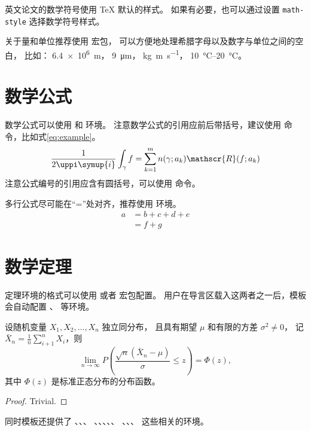 英文论文的数学符号使用 \TeX{} 默认的样式。
如果有必要，也可以通过设置 \verb|math-style| 选择数学符号样式。

关于量和单位推荐使用
\href{http://mirrors.ctan.org/macros/latex/contrib/siunitx/siunitx.pdf}{}
宏包，
可以方便地处理希腊字母以及数字与单位之间的空白，
比如：
\SI{6.4e6}{m}，
\SI{9}{\micro\meter}，
\si{kg.m.s^{-1}}，
\SIrange{10}{20}{\degreeCelsius}。



\section{数学公式}

数学公式可以使用  和  环境。
注意数学公式的引用应前后带括号，建议使用  命令，比如式\eqref{eq:example}。
\begin{equation}
  \frac{1}{2 \uppi \symup{i}} \int_\gamma f = \sum_{k=1}^m n(\gamma; a_k) \mathscr{R}(f; a_k)
  \label{eq:example}
\end{equation}
注意公式编号的引用应含有圆括号，可以使用  命令。

多行公式尽可能在“=”处对齐，推荐使用  环境。
\begin{align}
  a & = b + c + d + e \\
    & = f + g
\end{align}



\section{数学定理}

定理环境的格式可以使用  或者  宏包配置。
用户在导言区载入这两者之一后，模板会自动配置 、 等环境。

\begin{theorem}
  设随机变量 $X_1, X_2, \dots, X_n$ 独立同分布， 且具有期望 $\mu$ 和有限的方差 $\sigma^2 \ne 0$，
  记 $\bar{X}_n = \frac{1}{n} \sum_{i+1}^n X_i$，则
  \begin{equation}
    \lim_{n \to \infty} P \left(\frac{\sqrt{n} \left( \bar{X}_n - \mu \right)}{\sigma} \le z \right) = \Phi(z),
  \end{equation}
  其中 $\Phi(z)$ 是标准正态分布的分布函数。
\end{theorem}
\begin{proof}
  Trivial.
\end{proof}

同时模板还提供了 、、、
、、、、、
、、、 这些相关的环境。
